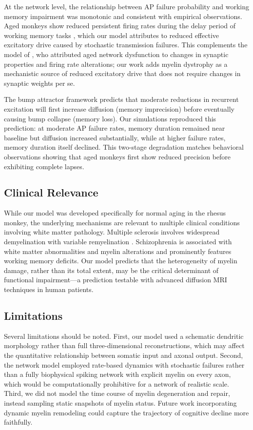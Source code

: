 \documentclass[11pt]{article}
\begin{document}
At the network level, the relationship between AP failure probability and working memory impairment was monotonic and consistent with empirical observations. Aged monkeys show reduced persistent firing rates during the delay period of working memory tasks \citep{wang2020}, which our model attributes to reduced effective excitatory drive caused by stochastic transmission failures. This complements the model of \citet{ibanez2020}, who attributed aged network dysfunction to changes in synaptic properties and firing rate alterations; our work adds myelin dystrophy as a mechanistic source of reduced excitatory drive that does not require changes in synaptic weights per se.

The bump attractor framework \citep{compte2000} predicts that moderate reductions in recurrent excitation will first increase diffusion (memory imprecision) before eventually causing bump collapse (memory loss). Our simulations reproduced this prediction: at moderate AP failure rates, memory duration remained near baseline but diffusion increased substantially, while at higher failure rates, memory duration itself declined. This two-stage degradation matches behavioral observations showing that aged monkeys first show reduced precision before exhibiting complete lapses.

\subsection{Clinical Relevance}

While our model was developed specifically for normal aging in the rhesus monkey, the underlying mechanisms are relevant to multiple clinical conditions involving white matter pathology. Multiple sclerosis involves widespread demyelination with variable remyelination \citep{fields2015}. Schizophrenia is associated with white matter abnormalities and myelin alterations and prominently features working memory deficits. Our model predicts that the heterogeneity of myelin damage, rather than its total extent, may be the critical determinant of functional impairment---a prediction testable with advanced diffusion MRI techniques in human patients.

\subsection{Limitations}

Several limitations should be noted. First, our model used a schematic dendritic morphology rather than full three-dimensional reconstructions, which may affect the quantitative relationship between somatic input and axonal output. Second, the network model employed rate-based dynamics with stochastic failures rather than a fully biophysical spiking network with explicit myelin on every axon, which would be computationally prohibitive for a network of realistic scale. Third, we did not model the time course of myelin degeneration and repair, instead sampling static snapshots of myelin status. Future work incorporating dynamic myelin remodeling could capture the trajectory of cognitive decline more faithfully.
\end{document}
